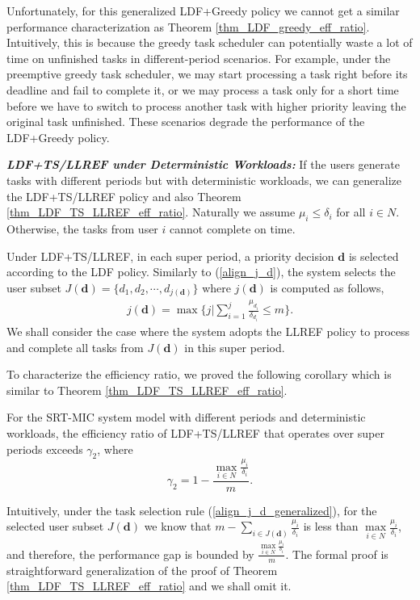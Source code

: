 \documentclass[prodmode,acmtompecs]{acmsmall}
\newcommand{\fullUserSet}{N}
\begin{document}
Unfortunately, for this generalized LDF+Greedy policy we cannot get a similar performance characterization as Theorem \ref{thm_LDF_greedy_eff_ratio}. Intuitively, this is because the greedy task scheduler can potentially waste a lot of time on unfinished tasks in different-period scenarios. For example, under the preemptive greedy task scheduler, we may start processing a task right before its deadline and fail to complete it, or we may process a task only for a short time before we have to switch to process another task with higher priority leaving the original task unfinished. These scenarios degrade the performance of the LDF+Greedy policy. 

{\bf \em LDF+TS/LLREF under Deterministic Workloads: }
If the users generate tasks with different periods but with deterministic workloads, we can generalize the LDF+TS/LLREF policy and also Theorem \ref{thm_LDF_TS_LLREF_eff_ratio}. 
Naturally we assume $\mu_i \leq \delta_i$ for all $i\in \fullUserSet$. Otherwise, the tasks from user $i$ cannot complete on time. 

Under LDF+TS/LLREF, in each super period, a priority decision $\mathbf{d}$ is selected according to the LDF policy. Similarly to (\ref{align_j_d}), the system selects the user subset $J(\mathbf{d}) = \{d_1, d_2, \cdots, d_{j(\mathbf{d})}\}$ where $j(\mathbf{d})$ is computed as follows, 
\begin{align}
\label{align_j_d_generalized}
j(\mathbf{d}) = \max\Big\{j | \sum\limits_{i = 1}^{j} \frac{\mu_{d_i}}{\delta_{d_i}} \leq m \Big\}. 
\end{align}
We shall consider the case where the system adopts the LLREF policy to process and complete all tasks from $J(\mathbf{d})$ in this super period. 

To characterize the efficiency ratio, we proved the following corollary which is similar to Theorem \ref{thm_LDF_TS_LLREF_eff_ratio}. 
\begin{corollary}
\label{corollary_LDF_TS_LLREF_eff_ratio_generalized}
For the SRT-MIC  system model with different periods and deterministic workloads, the efficiency ratio of LDF+TS/LLREF that operates over super periods exceeds $\gamma_2$, where
$$
\gamma_2 = 1 - \frac{\max\limits_{i \in \fullUserSet} \frac{\mu_i}{\delta_i}}{m}. 
$$
\end{corollary}

Intuitively, under the task selection rule (\ref{align_j_d_generalized}), for the selected user subset $J(\mathbf{d})$ we know that $m - \sum\limits_{i\in J(\mathbf{d})} \frac{\mu_i}{\delta_i}$ is less than $\max\limits_{i\in \fullUserSet} \frac{\mu_i}{\delta_i}$, and therefore, the performance gap is bounded by $\frac{\max\limits_{i \in \fullUserSet} \frac{\mu_i}{\delta_i}}{m}$. The formal proof is straightforward generalization of the proof of Theorem \ref{thm_LDF_TS_LLREF_eff_ratio} and we shall omit it. 
\end{document}
